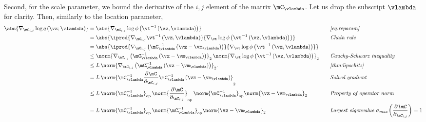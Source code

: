 \begin{proofEnd}
  Second, for the scale parameter, we bound the derivative of the \(i,j\) element of the matrix \(\mC_{\vlambda}\).
  Let us drop the subscript \(\vlambda\) for clarity.
  Then, similarly to the location parameter,
  \begin{alignat}{2}
    \abs{
      \nabla_{\mC_{i,j}} \log q\left(\vz; \vlambda\right)
    }
    &=
    \abs{
      \nabla_{\mC_{i,j}} \log \phi\left( \vt^{-1}\left(\vz, \vlambda\right) \right)
    }
    &&\quad\text{\textit{\cref{eq:reparam}}}
    \nonumber
    \\
    &=
    \abs{
      \iprod{
        \nabla_{\mC_{i,j}} \vt^{-1}\left(\vz, \vlambda\right)   
      }{
        \nabla_{\vt} \log \phi\left( \vt^{-1}\left(\vz, \vlambda\right) \right)   
      }
    }
    &&\quad\text{\textit{Chain rule}}
    \nonumber
    \\
    &=
    \abs{
      \iprod{
        \nabla_{\mC_{i,j}} \left( \mC^{-1}_{\vlambda}\left(\vz - \vm_{\vlambda}\right) \right)
      } {
        \nabla_{\vt} \log \phi\left( \vt^{-1}\left(\vz, \vlambda\right) \right)          
      }
    }
    \nonumber
    \\
    &\leq
    \norm{
      \nabla_{\mC_{i,j}} \left( \mC^{-1}_{\vlambda}\left(\vz - \vm_{\vlambda}\right) \right)
    }_2 \,
    \norm{
      \nabla_{\vt} \log \phi\left( \vt^{-1}\left(\vz, \vlambda\right) \right)          
    }_2
    &&\quad\text{\textit{Cauchy-Schwarz inequality}}
    \nonumber
    \\
    &\leq
    L\,
    \norm{
      \nabla_{\mC_{i,j}} \left( \mC^{-1}_{\vlambda}\left(\vz - \vm_{\vlambda}\right) \right)
    }_2.
    &&\quad\text{\textit{\cref{thm:lipschitz}}}
    \nonumber
    \\
    &=
    L\,
    \norm{
    \mC^{-1}_{\vlambda} \frac{\partial \mC}{\partial_{\mC_{i,j}}} \mC^{-1}_{\vlambda}  \left(\vz - \vm_{\vlambda}\right) 
    }_2
    \nonumber
    &&\quad\text{\textit{Solved gradient}}
    \\
    &\leq
    L\,
    \norm{
      \mC^{-1}_{\vlambda}
    }_{\text{op}} \,
    \norm{
      \frac{\partial \mC}{\partial_{\mC_{i,j}}}
    }_{\text{op}} \,
    \norm{
      \mC^{-1}_{\vlambda} 
    }_{\text{op}}
    \norm{
    \vz - \vm_{\vlambda}
    }_2
    \nonumber
    &&\quad\text{\textit{Property of operator norm}}
    \\
    &=
    L\,
    \norm{
      \mC^{-1}_{\vlambda}
    }_{\text{op}} \,
    \norm{
      \mC^{-1}_{\vlambda} 
    }_{\text{op}}
    \norm{
    \vz - \vm_{\vlambda}
    }_2
    &&\quad\text{\textit{Largest eigenvalue \(\sigma_{\text{max}}\left(\frac{\partial \mC}{\partial_{\mC_{i,j}}}\right) = 1\)}}

\end{alignat}
\end{proofEnd}
